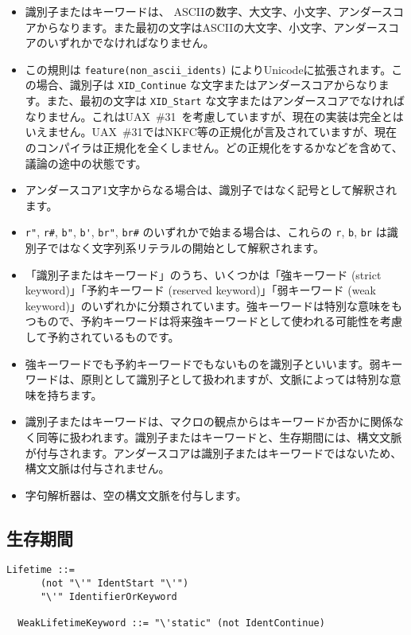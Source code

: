 \documentclass[dvipdfmx,uplatex,papersize,a4paper,10pt]{jsbook}
\theoremstyle{definition}
\begin{document}
\begin{itemize}
  \item 識別子またはキーワードは、 ASCIIの数字、大文字、小文字、アンダースコアからなります。また最初の文字はASCIIの大文字、小文字、アンダースコアのいずれかでなければなりません。
  \item この規則は \verb|feature(non_ascii_idents)| によりUnicodeに拡張されます。この場合、識別子は \verb|XID_Continue| な文字またはアンダースコアからなります。また、最初の文字は \verb|XID_Start| な文字またはアンダースコアでなければなりません。これはUAX~\#31~\cite{UAX31-25}を考慮していますが、現在の実装は完全とはいえません。UAX~\#31ではNKFC等の正規化が言及されていますが、現在のコンパイラは正規化を全くしません。どの正規化をするかなどを含めて、議論の途中の状態です。
  \item アンダースコア1文字からなる場合は、識別子ではなく記号として解釈されます。
  \item \verb|r"|, \verb|r#|, \verb|b"|, \verb|b'|, \verb|br"|, \verb|br#| のいずれかで始まる場合は、これらの \verb|r|, \verb|b|, \verb|br| は識別子ではなく文字列系リテラルの開始として解釈されます。
  \item 「識別子またはキーワード」のうち、いくつかは「強キーワード (strict keyword)」「予約キーワード (reserved keyword)」「弱キーワード (weak keyword)」のいずれかに分類されています。強キーワードは特別な意味をもつもので、予約キーワードは将来強キーワードとして使われる可能性を考慮して予約されているものです。
  \item 強キーワードでも予約キーワードでもないものを識別子といいます。弱キーワードは、原則として識別子として扱われますが、文脈によっては特別な意味を持ちます。
  \item 識別子またはキーワードは、マクロの観点からはキーワードか否かに関係なく同等に扱われます。識別子またはキーワードと、生存期間には、構文文脈が付与されます。アンダースコアは識別子またはキーワードではないため、構文文脈は付与されません。
  \item 字句解析器は、空の構文文脈を付与します。
\end{itemize}

\subsection{生存期間}

\begin{lstlisting}[language=BNFLike, gobble=2]
  Lifetime ::=
      (not "\'" IdentStart "\'")
      "\'" IdentifierOrKeyword

  WeakLifetimeKeyword ::= "\'static" (not IdentContinue)
\end{lstlisting}
\end{document}

